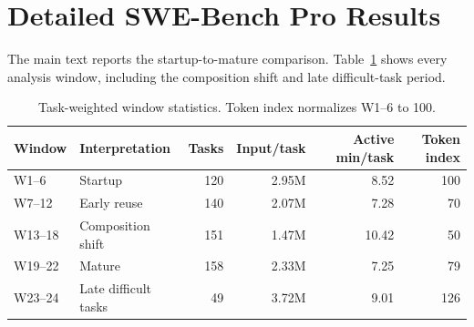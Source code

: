 \section{Detailed SWE-Bench Pro Results}
\label{app:detailed-results}

The main text reports the startup-to-mature comparison. Table~\ref{tab:swebench-windows}
shows every analysis window, including the composition shift and late difficult-task period.

\begin{table}[H]
\centering
\footnotesize
\renewcommand{\arraystretch}{1.10}
\begin{tabular}{@{}llrrrr@{}}
\toprule
\rowcolor{papersand}
\textbf{Window} & \textbf{Interpretation} & \textbf{Tasks} & \textbf{Input/task} & \textbf{Active min/task} & \textbf{Token index} \\
\midrule
W1--6 & Startup & 120 & 2.95M & 8.52 & 100 \\
W7--12 & Early reuse & 140 & 2.07M & 7.28 & 70 \\
W13--18 & Composition shift & 151 & 1.47M & 10.42 & 50 \\
W19--22 & Mature & 158 & 2.33M & 7.25 & 79 \\
W23--24 & Late difficult tasks & 49 & 3.72M & 9.01 & 126 \\
\bottomrule
\end{tabular}
\caption{Task-weighted \systemname window statistics. Token index normalizes
W1--6 to 100.}
\label{tab:swebench-windows}
\end{table}


